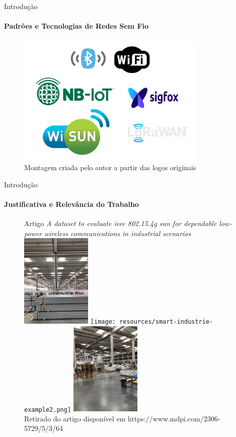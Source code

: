 \documentclass[t]{beamer}
\begin{document}
\begin{darkframes}
  \begin{frame}{Introdução}
    \framesubtitle{Padrões e Tecnologias de Redes Sem Fio}
    \begin{figure}[ht]
      \centering
      \includegraphics[width=0.8\textwidth]{resources/tecnologias-sem-fio.png}\\
      \footnotesize{Montagem criada pelo autor a partir das logos originais}
    \end{figure}
  \end{frame}

  \begin{frame}{Introdução}
    \framesubtitle{Justificativa e Relevância do Trabalho}
    \begin{figure}[ht]
      \centering
      Artigo \emph{A dataset to evaluate ieee 802.15.4g sun for dependable low-power wireless communications in industrial scenarios}
      \includegraphics[width=0.3\textwidth]{resources/smart-industrie-example.png}
      \texttt{[image: resources/smart-industrie-example2.png]}
      \includegraphics[width=0.3\textwidth]{resources/smart-industrie-example3.png}\\
      \footnotesize{Retirado do artigo disponível em https://www.mdpi.com/2306-5729/5/3/64}
    \end{figure}
  \end{frame}


\end{darkframes}
\end{document}
